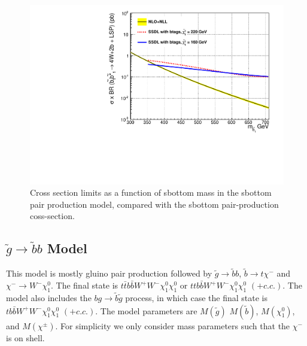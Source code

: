 \begin{figure}[htb]
\begin{center}
\includegraphics[width=0.48\linewidth]{figs/sbottom_1d.pdf}
\caption{Cross section limits as a function of sbottom mass
in the sbottom pair production model, compared with the 
sbottom pair-production coss-section.\label{fig:sbottomLimit1d}}

\end{center}
\end{figure}








\subsection{$\widetilde{g} \to \widetilde{b}b$ Model}
\label{sec:gbb}
This model is mostly gluino pair production followed by 
$\widetilde{g} \to \widetilde{b}b$, $\widetilde{b} \to t \chi^{-}$ and
$\chi^{-} \to W^- \chi_1^0$. 
The final state is $t\bar{t}b\bar{b}W^+W^- \chi_1^0 \chi_1^0$
or $ttb\bar{b}W^+W^- \chi_1^0 \chi_1^0$ $(+ c.c.)$.
The model also includes the $b g \to \widetilde{b} \widetilde{g}$ process,
in which case the final state is
$tb\bar{b}W^+W^- \chi_1^0 \chi_1^0$ $(+ c.c.)$. 
The model parameters are $M(\widetilde{g})$
$M(\widetilde{b})$, $M(\chi_1^0)$, and $M(\chi^{\pm})$.
For simplicity we only consider mass parameters such that the $\chi^{-}$ is on shell.

